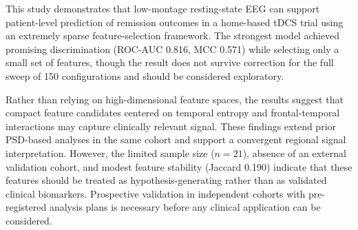 This study demonstrates that low-montage resting-state EEG can support patient-level prediction of remission outcomes in a home-based tDCS trial using an extremely sparse feature-selection framework. The strongest model achieved promising discrimination (ROC-AUC 0.816, MCC 0.571) while selecting only a small set of features, though the result does not survive correction for the full sweep of 150 configurations and should be considered exploratory.

Rather than relying on high-dimensional feature spaces, the results suggest that compact feature candidates centered on temporal entropy and frontal-temporal interactions may capture clinically relevant signal. These findings extend prior PSD-based analyses in the same cohort and support a convergent regional signal interpretation. However, the limited sample size ($n=21$), absence of an external validation cohort, and modest feature stability (Jaccard 0.190) indicate that these features should be treated as hypothesis-generating rather than as validated clinical biomarkers. Prospective validation in independent cohorts with pre-registered analysis plans is necessary before any clinical application can be considered.
